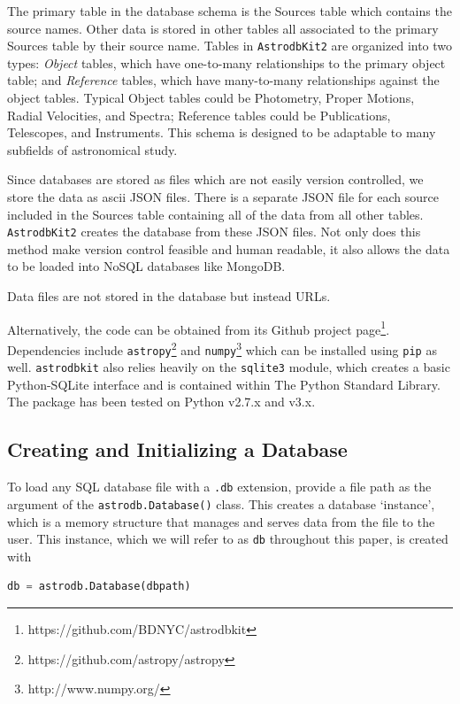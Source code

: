 \documentclass[iop,revtex4,natbib209]{emulateapj}
\begin{document}
The primary table in the database schema is the Sources table which contains the source names. Other data is stored in other tables all associated to the primary Sources table by their source name. Tables in \texttt{AstrodbKit2} are organized into two types: \textit{Object} tables, which have one-to-many relationships to the primary object table; and \textit{Reference} tables, which have many-to-many relationships against the object tables. 
Typical Object tables could be Photometry, Proper Motions, Radial Velocities, and Spectra; Reference tables could be Publications, Telescopes, and Instruments.
This schema is designed to be adaptable to many subfields of astronomical study.

Since databases are stored as files which are not easily version controlled, we store the data as ascii JSON files.
There is a separate JSON file for each source included in the Sources table containing all of the data from all other tables. 
\texttt{AstrodbKit2} creates the database from these JSON files. 
Not only does this method make version control feasible and human readable, it also allows the data to be loaded into NoSQL databases like MongoDB. 

Data files are not stored in the database but instead URLs.


Alternatively, the code can be obtained from its Github project page\footnote{https://github.com/BDNYC/astrodbkit}. Dependencies include \texttt{astropy}\footnote{https://github.com/astropy/astropy} \citep{astr13} and \texttt{numpy}\footnote{http://www.numpy.org/} which can be installed using \texttt{pip} as well. \texttt{astrodbkit} also relies heavily on the \texttt{sqlite3} module, which creates a basic Python-SQLite interface and is contained within The Python Standard Library. The package has been tested on Python v2.7.x and v3.x.

\subsection{Creating and Initializing a Database}{\label{sec:initialize}}

To load any SQL database file with a \texttt{.db} extension, provide a file path as the argument of the \texttt{astrodb.Database()} class. This creates a database `instance', which is a memory structure that manages and serves data from the file to the user. This instance, which we will refer to as \texttt{db} throughout this paper, is created with

\begin{lstlisting}[language=Python]
db = astrodb.Database(dbpath)
\end{lstlisting}
\end{document}

